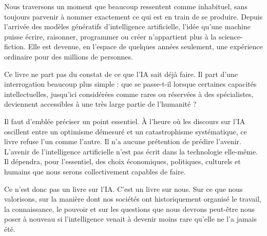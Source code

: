 
Nous traversons un moment que beaucoup ressentent comme inhabituel, sans toujours parvenir à nommer exactement ce qui est en train de se produire. Depuis l'arrivée des modèles génératifs d'intelligence artificielle, l'idée qu'une machine puisse écrire, raisonner, programmer ou créer n'appartient plus à la science-fiction. Elle est devenue, en l'espace de quelques années seulement, une expérience ordinaire pour des millions de personnes.

Ce livre ne part pas du constat de ce que l'IA sait déjà faire. Il part d'une interrogation beaucoup plus simple : que se passe-t-il lorsque certaines capacités intellectuelles, jusqu'ici considérées comme rares ou réservées à des spécialistes, deviennent accessibles à une très large partie de l'humanité ?

Il faut d'emblée préciser un point essentiel. À l'heure où les discours sur l'IA oscillent entre un optimisme démesuré et un catastrophisme systématique, ce livre refuse l'un comme l'autre. Il n'a aucune prétention de prédire l'avenir. L'avenir de l'intelligence artificielle n'est pas écrit dans la technologie elle-même. Il dépendra, pour l'essentiel, des choix économiques, politiques, culturels et humains que nous serons collectivement capables de faire.

Ce n'est donc pas un livre sur l'IA. C'est un livre sur nous. Sur ce que nous valorisons, sur la manière dont nos sociétés ont historiquement organisé le travail, la connaissance, le pouvoir et sur les questions que nous devrons peut-être nous poser à nouveau si l'intelligence venait à devenir moins rare qu'elle ne l'a jamais été.
